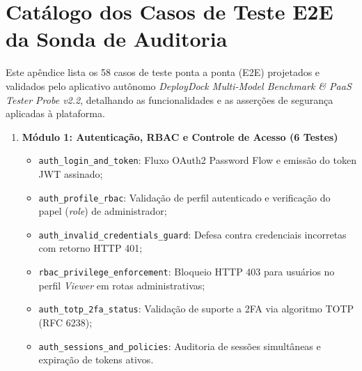 
\section{Catálogo dos Casos de Teste E2E da Sonda de Auditoria}
\label{apd:apendice-a}

Este apêndice lista os 58 casos de teste ponta a ponta (E2E) projetados e validados pelo aplicativo autônomo \textit{DeployDock Multi-Model Benchmark \& PaaS Tester Probe v2.2}, detalhando as funcionalidades e as asserções de segurança aplicadas à plataforma.

\begin{enumerate}
    \item \textbf{Módulo 1: Autenticação, RBAC e Controle de Acesso (6 Testes)}
    \begin{itemize}
        \item \texttt{auth\_login\_and\_token}: Fluxo OAuth2 Password Flow e emissão do token JWT assinado;
        \item \texttt{auth\_profile\_rbac}: Validação de perfil autenticado e verificação do papel (\textit{role}) de administrador;
        \item \texttt{auth\_invalid\_credentials\_guard}: Defesa contra credenciais incorretas com retorno HTTP 401;
        \item \texttt{rbac\_privilege\_enforcement}: Bloqueio HTTP 403 para usuários no perfil \textit{Viewer} em rotas administrativas;
        \item \texttt{auth\_totp\_2fa\_status}: Validação de suporte a 2FA via algoritmo TOTP (RFC 6238);
        \item \texttt{auth\_sessions\_and\_policies}: Auditoria de sessões simultâneas e expiração de tokens ativos.
    \end{itemize}


\end{enumerate}
